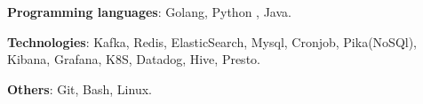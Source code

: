 \begin{cvempty} %
    \begin{cvitems} %
        \item{\textbf{Programming languages}: Golang, Python , Java.}
        \item{\textbf{Technologies}: Kafka, Redis, ElasticSearch, Mysql, Cronjob, Pika(NoSQl), Kibana, Grafana, K8S, Datadog, Hive, Presto.}
        \item{\textbf{Others}: Git, Bash, Linux.}
    \end{cvitems}
\end{cvempty}
